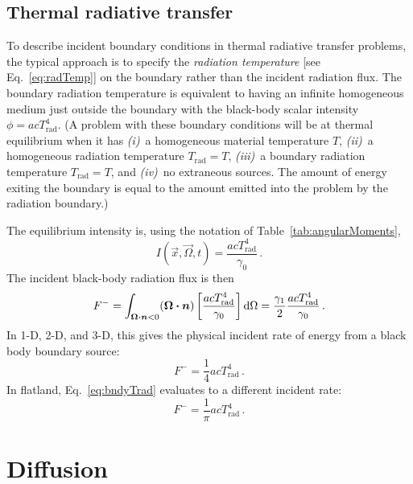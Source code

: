 \subsection{Thermal radiative transfer}\label{sec:trtBoundaryTemp}

To describe incident boundary conditions in thermal radiative transfer
problems, the typical approach is to specify the \emph{radiation temperature}
[see Eq.~\eqref{eq:radTemp}] on the boundary rather than the incident
radiation flux. The boundary radiation temperature is equivalent to having an
infinite homogeneous medium just outside the boundary with the black-body scalar
intensity $\phi=ac T_\text{rad}^4$. (A problem with these boundary conditions
will be at thermal equilibrium when it has \textsl{(i)}~a homogeneous material
temperature $T$, \textsl{(ii)}~a homogeneous radiation temperature
$T_\text{rad}=T$, \textsl{(iii)}~a boundary radiation temperature $T_\text{rad}
= T$, and \textsl{(iv)}~no extraneous sources. The amount of energy exiting the
boundary is equal to the amount emitted into the problem by the radiation
boundary.)

The equilibrium intensity is, using the notation of
Table~\ref{tab:angularMoments},
\begin{equation*}
  I(\vec{x},\vec{\Omega}, t) = \frac{a c T_\text{rad}^4}{\gamma_0}\,.
\end{equation*}
The incident black-body radiation flux is then
\begin{equation}\label{eq:bndyTrad}
  F^- = \int_{\bm{\Omega}\bm{\cdot}\bm{n} < 0} (\bm{\Omega}\bm{\cdot} \bm{n})
  \left[ \frac{a c T_\text{rad}^4}{\gamma_0} \right] \mathop{}\!\mathrm{d}\Omega
  = \frac{\gamma_1}{2} \frac{a c T_\text{rad}^4}{\gamma_0} \,.
\end{equation}
In 1-D, 2-D, and 3-D, this gives the physical incident rate of energy from a
black body boundary source:
\begin{equation}\label{eq:bndyTrad3D}
  F^- = \frac{1}{4} a c T_\text{rad}^4 \,.
\end{equation}
In flatland, Eq.~\eqref{eq:bndyTrad} evaluates to a different incident rate:
\begin{equation}\label{eq:bndyTradFlatland}
  F^- = \frac{1}{\pi} a c T_\text{rad}^4 \,.
\end{equation}

\section{Diffusion}


